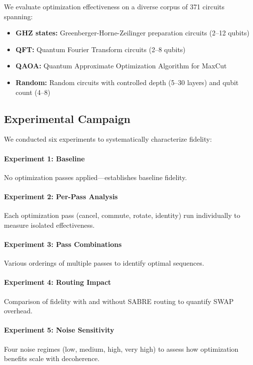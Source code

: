 \documentclass[twocolumn,showpacs,preprintnumbers,amsmath,amssymb,prb]{revtex4-2}
\begin{document}
We evaluate optimization effectiveness on a diverse corpus of 371 circuits spanning:

\begin{itemize}
    \item \textbf{GHZ states:} Greenberger-Horne-Zeilinger preparation circuits (2--12 qubits)
    \item \textbf{QFT:} Quantum Fourier Transform circuits (2--8 qubits)
    \item \textbf{QAOA:} Quantum Approximate Optimization Algorithm for MaxCut
    \item \textbf{Random:} Random circuits with controlled depth (5--30 layers) and qubit count (4--8)
\end{itemize}

\subsection{Experimental Campaign}

We conducted six experiments to systematically characterize fidelity:

\paragraph{Experiment 1: Baseline} No optimization passes applied---establishes baseline fidelity.

\paragraph{Experiment 2: Per-Pass Analysis} Each optimization pass (cancel, commute, rotate, identity) run individually to measure isolated effectiveness.

\paragraph{Experiment 3: Pass Combinations} Various orderings of multiple passes to identify optimal sequences.

\paragraph{Experiment 4: Routing Impact} Comparison of fidelity with and without SABRE routing to quantify SWAP overhead.

\paragraph{Experiment 5: Noise Sensitivity} Four noise regimes (low, medium, high, very high) to assess how optimization benefits scale with decoherence.
\end{document}
